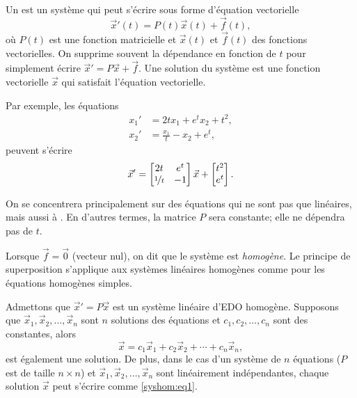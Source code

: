 Un \emph{} est un système qui peut s’écrire sous forme d’équation vectorielle
\begin{equation*}
{\vec{x}}'(t) = P(t)\vec{x}(t) + \vec{f}(t),
\end{equation*}
où $P(t)$ est une fonction matricielle et $\vec{x}(t)$ et $\vec{f}(t)$ des fonctions vectorielles. On supprime souvent la dépendance en fonction de $t$ pour simplement écrire ${\vec{x}}' = P\vec{x} + \vec{f}$.  Une solution du système est une fonction vectorielle
$\vec{x}$ qui satisfait l’équation vectorielle.

Par exemple, les équations
\begin{align*}
x_1' &= 2t x_1 + e^t x_2 + t^2 , \\
x_2' &= \frac{x_1}{t} -x_2 + e^t ,
\end{align*}
peuvent s'écrire
\begin{equation*}
{\vec{x}}' = 
\begin{bmatrix}
2t & e^t \\
\nicefrac{1}{t} & -1
\end{bmatrix}
\vec{x}
+
\begin{bmatrix}
t^2 \\
e^t
\end{bmatrix} .
\end{equation*}

On se concentrera principalement sur des équations qui ne sont pas que linéaires, mais aussi à \emph{}.  En d’autres termes, la matrice $P$ sera constante; elle ne dépendra pas de $t$.

\medskip

Lorsque $\vec{f} = \vec{0}$ (vecteur nul), on dit que le système est
\emph{homogène}.
Le principe de superposition s’applique aux systèmes linéaires homogènes comme pour les équations homogènes simples.

\begin{theorem}[Superposition]
Admettons que
${\vec{x}}' = P\vec{x}$ est un système linéaire d’EDO homogène. Supposons que
$\vec{x}_1,\vec{x}_2,\ldots,\vec{x}_n$ sont $n$ solutions des équations et  $c_1,c_2,\ldots,c_n$ sont des constantes, alors
\begin{equation} \label{syshom:eq1}
\vec{x} = c_1 \vec{x}_1 + c_2 \vec{x}_2 + \cdots + c_n \vec{x}_n ,
\end{equation}
est également une solution. De plus, dans le cas d'un système de $n$ équations ($P$ est de taille $n\times n$) et
$\vec{x}_1,\vec{x}_2,\ldots,\vec{x}_n$ sont linéairement indépendantes, chaque solution $\vec{x}$ peut s’écrire comme \eqref{syshom:eq1}.
\end{theorem}

